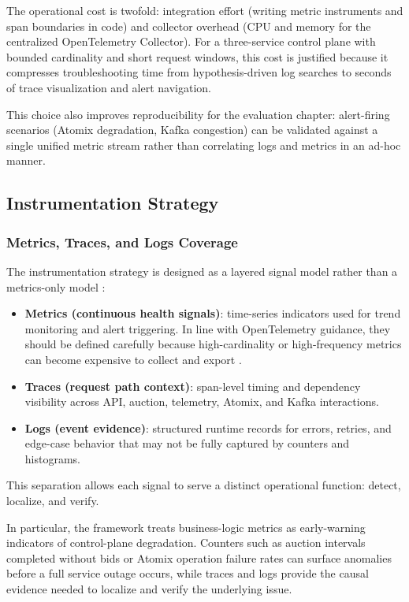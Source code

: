 The operational cost is twofold: integration effort (writing metric instruments and span boundaries in code) and collector overhead (CPU and memory for the centralized OpenTelemetry Collector). For a three-service control plane with bounded cardinality and short request windows, this cost is justified because it compresses troubleshooting time from hypothesis-driven log searches to seconds of trace visualization and alert navigation.

This choice also improves reproducibility for the evaluation chapter: alert-firing scenarios (Atomix degradation, Kafka congestion) can be validated against a single unified metric stream rather than correlating logs and metrics in an ad-hoc manner.

\subsection{Instrumentation Strategy}

\subsubsection{Metrics, Traces, and Logs Coverage}

The instrumentation strategy is designed as a layered signal model rather than a metrics-only model \citep{majorsObservabilityEngineering2022}:

\begin{itemize}
\item \textbf{Metrics (continuous health signals)}: time-series indicators used for trend monitoring and alert triggering. In line with OpenTelemetry guidance, they should be defined carefully because high-cardinality or high-frequency metrics can become expensive to collect and export \citep{opentelemetryDocsMetricsBestPractices}.
\item \textbf{Traces (request path context)}: span-level timing and dependency visibility across API, auction, telemetry, Atomix, and Kafka interactions.
\item \textbf{Logs (event evidence)}: structured runtime records for errors, retries, and edge-case behavior that may not be fully captured by counters and histograms.
\end{itemize}

This separation allows each signal to serve a distinct operational function: detect, localize, and verify.

In particular, the framework treats business-logic metrics as early-warning indicators of control-plane degradation. Counters such as auction intervals completed without bids or Atomix operation failure rates can surface anomalies before a full service outage occurs, while traces and logs provide the causal evidence needed to localize and verify the underlying issue.

